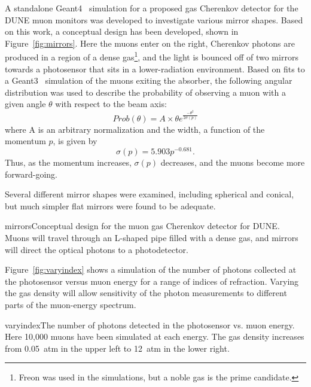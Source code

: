 A standalone Geant4~\cite{GEANT4:NIM}  
simulation for a proposed gas Cherenkov detector
for the DUNE muon monitors was developed to investigate various mirror
shapes.  Based on this work, a conceptual design has been developed,
 shown in Figure~\ref{fig:mirrors}.  Here the muons enter on the
right, Cherenkov photons are produced in a region of a dense
gas\footnote{Freon was used in the simulations, but a noble gas is the
prime candidate.}, and the light is bounced off of two mirrors towards a
photosensor that sits in a lower-radiation environment. Based on fits
to a Geant3~\cite{Geant3}  simulation of the muons exiting the absorber, the
following angular distribution was used to describe the probability of
observing a muon with a given angle $\theta$ with respect to the beam axis:
\begin{equation}
Prob(\theta)=A \times \theta e^{\frac{-\theta^2}{2\sigma (p)}}
\end{equation}
where A is an arbitrary normalization and the width, a function of
the momentum $p$, is given by
\begin{equation}
\sigma (p) = 5.903 p^{-0.681}.
\end{equation}
Thus, as the momentum increases, $\sigma (p)$ decreases, and the muons
become more forward-going.

Several different mirror shapes were examined, including spherical and 
conical, but much simpler flat mirrors were found to be adequate. 


\begin{cdrfigure}{mirrors}{Conceptual design for the muon gas Cherenkov detector for DUNE.  
Muons will travel through an L-shaped pipe filled with a dense gas,
and mirrors will direct the optical photons to a photodetector.}
\end{cdrfigure}

Figure~\ref{fig:varyindex} shows a simulation of 
the number of photons collected at the photosensor versus muon energy for
a range of indices of refraction.  Varying the gas density will allow sensitivity of 
the photon measurements to different parts of the muon-energy spectrum.

\begin{cdrfigure}{varyindex}{The number of photons detected in the photosensor vs. muon energy.  
Here 10,000 muons have been simulated at each energy.  The gas density
increases from 0.05~atm in the upper left to 12~atm in the lower
right.}
\end{cdrfigure}

